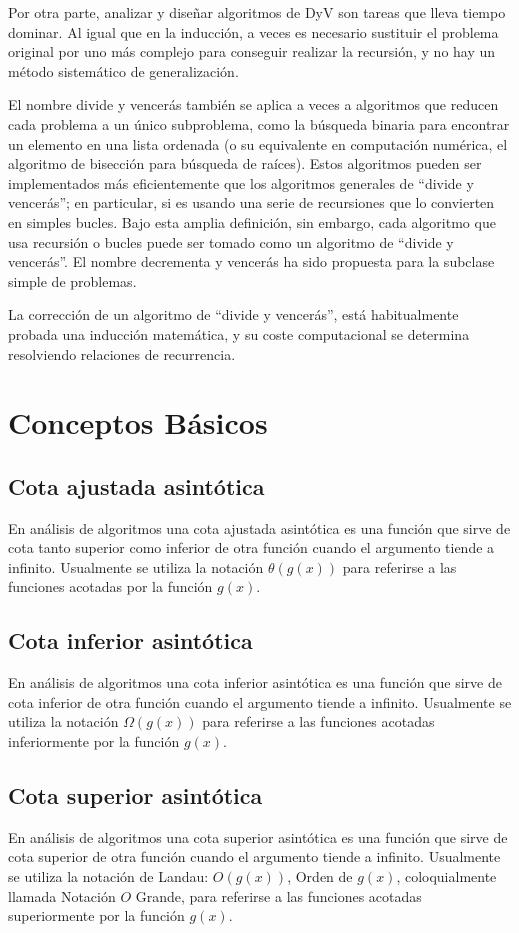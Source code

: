 \documentclass[12pt,twoside]{article}
\begin{document}
Por otra parte, analizar y diseñar algoritmos de DyV son tareas que lleva tiempo dominar. Al igual que en la inducción, a veces es necesario sustituir el problema original por uno más complejo para conseguir realizar la recursión, y no hay un método sistemático de generalización.

El nombre divide y vencerás también se aplica a veces a algoritmos que reducen cada problema a un único subproblema, como la búsqueda binaria para encontrar un elemento en una lista ordenada (o su equivalente en computación numérica, el algoritmo de bisección para búsqueda de raíces). Estos algoritmos pueden ser implementados más eficientemente que los algoritmos generales de “divide y vencerás”; en particular, si es usando una serie de recursiones que lo convierten en simples bucles. Bajo esta amplia definición, sin embargo, cada algoritmo que usa recursión o bucles puede ser tomado como un algoritmo de “divide y vencerás”. El nombre decrementa y vencerás ha sido propuesta para la subclase simple de problemas.

La corrección de un algoritmo de “divide y vencerás”, está habitualmente probada una inducción matemática, y su coste computacional se determina resolviendo relaciones de recurrencia.\cite{al1} 


\section{Conceptos Básicos}

\subsection{Cota ajustada asintótica}
En análisis de algoritmos una cota ajustada asintótica es una función que sirve de cota tanto superior como inferior de otra función cuando el argumento tiende a infinito. Usualmente se utiliza la notación $\theta(g(x))$ para referirse a las funciones acotadas por la función $g(x)$.\cite{cota}
\subsection{Cota inferior asintótica}
En análisis de algoritmos una cota inferior asintótica es una función que sirve de cota inferior de otra función cuando el argumento tiende a infinito. Usualmente se utiliza la notación $\Omega(g(x))$ para referirse a las funciones acotadas inferiormente por la función $g(x)$.\cite{cota}

\subsection{Cota superior asintótica}
En análisis de algoritmos una cota superior asintótica es una función que sirve de cota superior de otra función cuando el argumento tiende a infinito. Usualmente se utiliza la notación de Landau: $O(g(x))$, Orden de $g(x)$, coloquialmente llamada Notación $O$ Grande, para referirse a las funciones acotadas superiormente por la función $g(x)$.\cite{cota}
\end{document}
